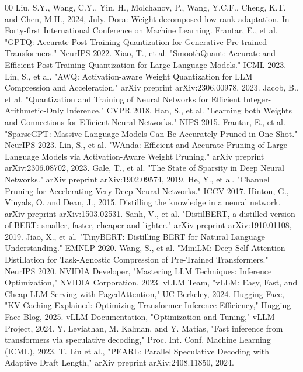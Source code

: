 \documentclass[11pt]{IEEEtran}
\begin{document}
\begin{thebibliography}{00}
 Liu, S.Y., Wang, C.Y., Yin, H., Molchanov, P., Wang, Y.C.F., Cheng, K.T. and Chen, M.H., 2024, July. Dora: Weight-decomposed low-rank adaptation. In Forty-first International Conference on Machine Learning.
 Frantar, E., et al. "GPTQ: Accurate Post-Training Quantization for Generative Pre-trained Transformers." NeurIPS 2022.
 Xiao, T., et al. "SmoothQuant: Accurate and Efficient Post-Training Quantization for Large Language Models." ICML 2023.
 Lin, S., et al. "AWQ: Activation-aware Weight Quantization for LLM Compression and Acceleration." arXiv preprint arXiv:2306.00978, 2023.
 Jacob, B., et al. "Quantization and Training of Neural Networks for Efficient Integer-Arithmetic-Only Inference." CVPR 2018.
 Han, S., et al. "Learning both Weights and Connections for Efficient Neural Networks." NIPS 2015.
 Frantar, E., et al. "SparseGPT: Massive Language Models Can Be Accurately Pruned in One-Shot." NeurIPS 2023.
 Lin, S., et al. "WAnda: Efficient and Accurate Pruning of Large Language Models via Activation-Aware Weight Pruning." arXiv preprint arXiv:2306.08702, 2023.
 Gale, T., et al. "The State of Sparsity in Deep Neural Networks." arXiv preprint arXiv:1902.09574, 2019.
 He, Y., et al. "Channel Pruning for Accelerating Very Deep Neural Networks." ICCV 2017.
 Hinton, G., Vinyals, O. and Dean, J., 2015. Distilling the knowledge in a neural network. arXiv preprint arXiv:1503.02531.
 Sanh, V., et al. "DistilBERT, a distilled version of BERT: smaller, faster, cheaper and lighter." arXiv preprint arXiv:1910.01108, 2019.
 Jiao, X., et al. "TinyBERT: Distilling BERT for Natural Language Understanding." EMNLP 2020.
 Wang, S., et al. "MiniLM: Deep Self-Attention Distillation for Task-Agnostic Compression of Pre-Trained Transformers." NeurIPS 2020.
 NVIDIA Developer, "Mastering LLM Techniques: Inference Optimization," NVIDIA Corporation, 2023.
 vLLM Team, "vLLM: Easy, Fast, and Cheap LLM Serving with PagedAttention," UC Berkeley, 2024.
 Hugging Face, "KV Caching Explained: Optimizing Transformer Inference Efficiency," Hugging Face Blog, 2025.
 vLLM Documentation, "Optimization and Tuning," vLLM Project, 2024.
 Y. Leviathan, M. Kalman, and Y. Matias, "Fast inference from transformers via speculative decoding," Proc. Int. Conf. Machine Learning (ICML), 2023.
 T. Liu et al., "PEARL: Parallel Speculative Decoding with Adaptive Draft Length," arXiv preprint arXiv:2408.11850, 2024.

\end{thebibliography}
\end{document}

